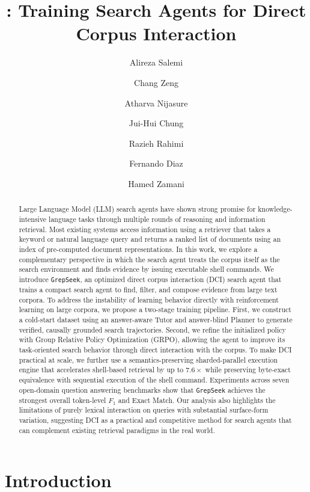 \documentclass{llmxive}
\title{\ourmethod{}: Training Search Agents for Direct Corpus Interaction}
\author{Alireza Salemi \and Chang Zeng \and Atharva Nijasure \and Jui-Hui Chung \and Razieh Rahimi \and Fernando Diaz \and Hamed Zamani}
\providecommand{\ourmethod}{\texttt{GrepSeek}\xspace}
\begin{document}
\maketitle
\begin{abstract}
Large Language Model (LLM) search agents have shown strong promise for knowledge-intensive language tasks through multiple rounds of reasoning and information retrieval. Most existing systems access information using a retriever that takes a keyword or natural language query and returns a ranked list of documents using an index of pre-computed document representations. In this work, we explore a complementary perspective in which the search agent treats the corpus itself as the search environment and finds evidence by issuing executable shell commands. We introduce \ourmethod{}, an optimized direct corpus interaction (DCI) search agent that trains a compact search agent to find, filter, and compose evidence from large text corpora. To address the instability of learning behavior directly with reinforcement learning on large corpora, we propose a two-stage training pipeline. First, we construct a cold-start dataset using an answer-aware Tutor and answer-blind Planner to generate verified, causally grounded search trajectories. Second, we refine the initialized policy with Group Relative Policy Optimization (GRPO), allowing the agent to improve its task-oriented search behavior through direct interaction with the corpus. To make DCI practical at scale, we further use a semantics-preserving sharded-parallel execution engine that accelerates shell-based retrieval by up to $7.6\times$ while preserving byte-exact equivalence with sequential execution of the shell command. Experiments across seven open-domain question answering benchmarks show that \ourmethod{} achieves the strongest overall token-level $F_1$ and Exact Match. Our analysis also highlights the limitations of purely lexical interaction on queries with substantial surface-form variation, suggesting DCI as a practical and competitive method for search agents that can complement existing retrieval paradigms in the real world.
\end{abstract}
\section{Introduction}
\end{document}
